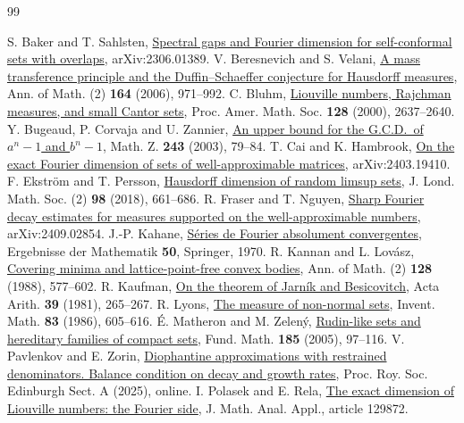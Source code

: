 \documentclass[11pt,a4paper,reqno]{amsart}
\theoremstyle{definition}
\theoremstyle{remark}
\numberwithin{equation}{section}
\begin{document}
\begin{thebibliography}{99}
\raggedright
{} S. Baker and T. Sahlsten, \href{https://arxiv.org/abs/2306.01389}{Spectral gaps and Fourier dimension for self-conformal sets with overlaps}, arXiv:2306.01389.
 V. Beresnevich and S. Velani, \href{https://doi.org/10.4007/annals.2006.164.971}{A mass transference principle and the Duffin--Schaeffer conjecture for Hausdorff measures}, Ann. of Math. (2) \textbf{164} (2006), 971--992.
 C. Bluhm, \href{https://doi.org/10.1090/S0002-9939-00-05276-X}{Liouville numbers, Rajchman measures, and small Cantor sets}, Proc. Amer. Math. Soc. \textbf{128} (2000), 2637--2640.
 Y. Bugeaud, P. Corvaja and U. Zannier, \href{https://doi.org/10.1007/s00209-002-0449-z}{An upper bound for the G.C.D.\ of \(a^n-1\) and \(b^n-1\)}, Math. Z. \textbf{243} (2003), 79--84.
 T. Cai and K. Hambrook, \href{https://arxiv.org/abs/2403.19410}{On the exact Fourier dimension of sets of well-approximable matrices}, arXiv:2403.19410.
 F. Ekstr\"om and T. Persson, \href{https://doi.org/10.1112/jlms.12158}{Hausdorff dimension of random limsup sets}, J. Lond. Math. Soc. (2) \textbf{98} (2018), 661--686.
 R. Fraser and T. Nguyen, \href{https://arxiv.org/abs/2409.02854}{Sharp Fourier decay estimates for measures supported on the well-approximable numbers}, arXiv:2409.02854.
 J.-P. Kahane, \href{https://doi.org/10.1007/978-3-662-59158-1}{S\'eries de Fourier absolument convergentes}, Ergebnisse der Mathematik \textbf{50}, Springer, 1970.
 R. Kannan and L. Lov\'asz, \href{https://doi.org/10.2307/1971436}{Covering minima and lattice-point-free convex bodies}, Ann. of Math. (2) \textbf{128} (1988), 577--602.
 R. Kaufman, \href{https://doi.org/10.4064/aa-39-3-265-267}{On the theorem of Jarn\'ik and Besicovitch}, Acta Arith. \textbf{39} (1981), 265--267.
 R. Lyons, \href{https://gdz.sub.uni-goettingen.de/download/pdf/PPN356556735_0083/LOG_0050.pdf}{The measure of non-normal sets}, Invent. Math. \textbf{83} (1986), 605--616.
 \'E. Matheron and M. Zelen\'y, \href{https://doi.org/10.4064/fm185-2-1}{Rudin-like sets and hereditary families of compact sets}, Fund. Math. \textbf{185} (2005), 97--116.
 V. Pavlenkov and E. Zorin, \href{https://doi.org/10.1017/prm.2025.10060}{Diophantine approximations with restrained denominators. Balance condition on decay and growth rates}, Proc. Roy. Soc. Edinburgh Sect. A (2025), online.
 I. Polasek and E. Rela, \href{https://doi.org/10.1016/j.jmaa.2025.129872}{The exact dimension of Liouville numbers: the Fourier side}, J. Math. Anal. Appl., article 129872.

\end{thebibliography}
\end{document}
